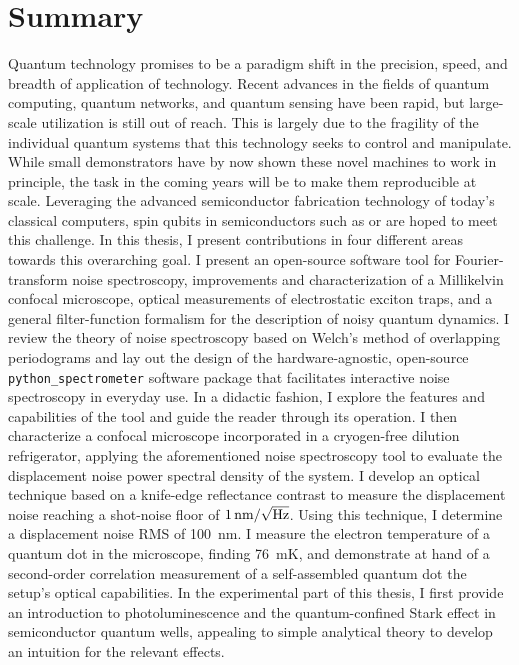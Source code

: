 \documentclass[a4paper,10pt]{article}
\begin{document}
\section*{Summary}
Quantum technology promises to be a paradigm shift in the precision, speed, and breadth of application of technology.
Recent advances in the fields of quantum computing, quantum networks, and quantum sensing have been rapid, but large-scale utilization is still out of reach.
This is largely due to the fragility of the individual quantum systems that this technology seeks to control and manipulate.
While small demonstrators have by now shown these novel machines to work in principle, the task in the coming years will be to make them reproducible at scale.
Leveraging the advanced semiconductor fabrication technology of today's classical computers, spin qubits in semiconductors such as  or  are hoped to meet this challenge.
In this thesis, I present contributions in four different areas towards this overarching goal.
I present an open-source software tool for Fourier-transform noise spectroscopy, improvements and characterization of a Millikelvin confocal microscope, optical measurements of electrostatic exciton traps, and a general filter-function formalism for the description of noisy quantum dynamics.
I review the theory of noise spectroscopy based on Welch's method of overlapping periodograms and lay out the design of the hardware-agnostic, open-source \texttt{python\_spectrometer} software package that facilitates interactive noise spectroscopy in everyday use.
In a didactic fashion, I explore the features and capabilities of the tool and guide the reader through its operation.
I then characterize a confocal microscope incorporated in a cryogen-free dilution refrigerator, applying the aforementioned noise spectroscopy tool to evaluate the displacement noise power spectral density of the system.
I develop an optical technique based on a knife-edge reflectance contrast to measure the displacement noise reaching a shot-noise floor of $\qty{1}{\nano\meter\per\sqrt{\hertz}}$.
Using this technique, I determine a displacement noise RMS of \qty{100}{\nano\meter}.
I measure the electron temperature of a  quantum dot in the microscope, finding \qty{76}{\milli\kelvin}, and demonstrate at hand of a second-order correlation measurement of a self-assembled quantum dot the setup's optical capabilities.
In the experimental part of this thesis, I first provide an introduction to photoluminescence and the quantum-confined Stark effect in semiconductor quantum wells, appealing to simple analytical theory to develop an intuition for the relevant effects.
\end{document}
